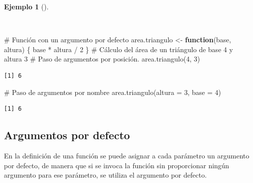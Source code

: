 \documentclass[
  a4paper,
]{scrreport}
\newenvironment{Shaded}{\begin{snugshade}}{\end{snugshade}}
\newcommand{\AttributeTok}[1]{\textcolor[rgb]{0.40,0.45,0.13}{#1}}
\newcommand{\CommentTok}[1]{\textcolor[rgb]{0.37,0.37,0.37}{#1}}
\newcommand{\ControlFlowTok}[1]{\textcolor[rgb]{0.00,0.23,0.31}{\textbf{#1}}}
\newcommand{\DecValTok}[1]{\textcolor[rgb]{0.68,0.00,0.00}{#1}}
\newcommand{\FunctionTok}[1]{\textcolor[rgb]{0.28,0.35,0.67}{#1}}
\newcommand{\NormalTok}[1]{\textcolor[rgb]{0.00,0.23,0.31}{#1}}
\newcommand{\OtherTok}[1]{\textcolor[rgb]{0.00,0.23,0.31}{#1}}
\newcommand{\SpecialCharTok}[1]{\textcolor[rgb]{0.37,0.37,0.37}{#1}}
\theoremstyle{definition}
\theoremstyle{definition}
\newtheorem{example}{Ejemplo}[chapter]
\theoremstyle{remark}
\begin{document}
\begin{example}[]\protect\hypertarget{exm-paso-parametros-funcion}{}\label{exm-paso-parametros-funcion}

~

\begin{Shaded}
\begin{Highlighting}[]
\CommentTok{\# Función con un argumento por defecto}
\NormalTok{area.triangulo }\OtherTok{\textless{}{-}} \ControlFlowTok{function}\NormalTok{(base, altura) \{}
\NormalTok{  base }\SpecialCharTok{*}\NormalTok{ altura }\SpecialCharTok{/} \DecValTok{2}
\NormalTok{\}}
\CommentTok{\# Cálculo del área de un triángulo de base 4 y altura 3}
\CommentTok{\# Paso de argumentos por posición. }
\FunctionTok{area.triangulo}\NormalTok{(}\DecValTok{4}\NormalTok{, }\DecValTok{3}\NormalTok{)}
\end{Highlighting}
\end{Shaded}

\begin{verbatim}
[1] 6
\end{verbatim}

\begin{Shaded}
\begin{Highlighting}[]
\CommentTok{\# Paso de argumentos por nombre}
\FunctionTok{area.triangulo}\NormalTok{(}\AttributeTok{altura =} \DecValTok{3}\NormalTok{, }\AttributeTok{base =} \DecValTok{4}\NormalTok{)}
\end{Highlighting}
\end{Shaded}

\begin{verbatim}
[1] 6
\end{verbatim}

\end{example}

\subsection{Argumentos por defecto}\label{argumentos-por-defecto}

En la definición de una función se puede asignar a cada parámetro un
argumento por defecto, de manera que si se invoca la función sin
proporcionar ningún argumento para ese parámetro, se utiliza el
argumento por defecto.
\end{document}
